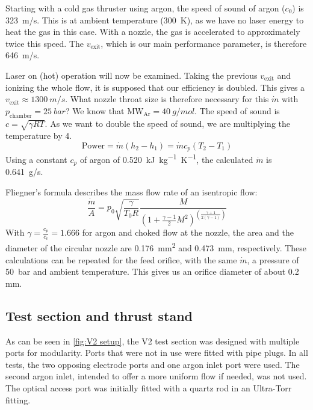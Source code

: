             Starting with a cold gas thruster using argon, the speed of sound of argon ($c_0$) is \qty{323}{m/s}. This is at ambient temperature (\qty{300}{K}), as we have no laser energy to heat the gas in this case. With a nozzle, the gas is accelerated to approximately twice this speed. The $v_\mathrm{exit}$, which is our main performance parameter, is therefore \qty{646}{m/s}.
            
            Laser on (hot) operation will now be examined. Taking the previous $v_\mathrm{exit}$ and ionizing the whole flow, it is supposed that our efficiency is doubled. This gives a $v_\mathrm{exit}\approx \qty{1300}{m/s}$. What nozzle throat size is therefore necessary for this $\dot m$ with $p_\mathrm{chamber} = \qty{25}{bar}$? We know that $\mathrm{MW_{Ar}} = \qty{40}{g/mol}$. The speed of sound is $c = \sqrt{\gamma R T}$. As we want to double the speed of sound, we are multiplying the temperature by 4.
            \[\text{Power} = \dot m (h_2-h_1)
            = \dot m c_p (T_2-T_1)\]
            Using a constant $c_p$ of argon of \qty{0.520}{kJ.kg^{-1}.K^{-1}}, the calculated $\dot m$ is \qty{0.641}{g/s}.
            
            Fliegner's formula describes the mass flow rate of an isentropic flow:
            \[\frac{\dot m}{A} = p_0\sqrt{\frac{\gamma}{T_0 R}}\frac{M}{(1+\frac{\gamma-1}{2}M^2)^{(\frac{\gamma+1}{2(\gamma-1)})}}\]
            With $\gamma = \frac{c_p}{c_v} = 1.666$ for argon and choked flow at the nozzle, the area and the diameter of the circular nozzle are \qty{0.176}{mm^2} and \qty{0.473}{mm}, respectively. These calculations can be repeated for the feed orifice, with the same $\dot m$, a pressure of \qty{50}{bar} and ambient temperature. This gives us an orifice diameter of about 0.2 mm.
        
        \subsection{Test section and thrust stand}
            
            As can be seen in \autoref{fig:V2 setup}, the V2 test section was designed with multiple ports for modularity. Ports that were not in use were fitted with pipe plugs. In all tests, the two opposing electrode ports and one argon inlet port were used. The second argon inlet, intended to offer a more uniform flow if needed, was not used. The optical access port was initially fitted with a quartz rod in an Ultra-Torr fitting.

